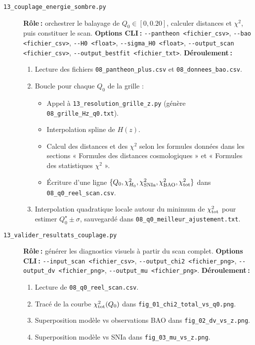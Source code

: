 \begin{description}
  \item[\texttt{13\_couplage\_energie\_sombre.py}]
    \textbf{Rôle :} orchestrer le balayage de \(Q_{0}\in[0,0.20]\), calculer distances et \(\chi^2\), puis constituer le scan.
    \textbf{Options CLI :}
      \verb|--pantheon <fichier_csv>|,
      \verb|--bao <fichier_csv>|,
      \verb|--H0 <float>|,
      \verb|--sigma_H0 <float>|,
      \verb|--output_scan <fichier_csv>|,
      \verb|--output_bestfit <fichier_txt>|.
    \textbf{Déroulement :}
    \begin{enumerate}
      \item Lecture des fichiers \texttt{08\_pantheon\_plus.csv} et \texttt{08\_donnees\_bao.csv}.
      \item Boucle pour chaque \(Q_{0}\) de la grille :
        \begin{itemize}
          \item Appel à \texttt{13\_resolution\_grille\_z.py} (génère \texttt{08\_grille\_Hz\_q0.txt}).
          \item Interpolation spline de \(H(z)\).
           \item Calcul des distances et des \(\chi^2\) selon les formules données dans les sections « Formules des distances cosmologiques » et « Formules des statistiques \(\chi^2\) ».
          \item Écriture d’une ligne \(\{Q_{0},\chi^{2}_{H_{0}},\chi^{2}_{\rm SNIa},\chi^{2}_{\rm BAO},\chi^{2}_{\rm tot}\}\)
                dans \texttt{08\_q0\_reel\_scan.csv}.
        \end{itemize}
      \item Interpolation quadratique locale autour du minimum de \(\chi^{2}_{\rm tot}\)
            pour estimer \(Q_{0}^{\star}\pm\sigma\), sauvegardé dans \texttt{08\_q0\_meilleur\_ajustement.txt}.
    \end{enumerate}

  \item[\texttt{13\_valider\_resultats\_couplage.py}]
    \textbf{Rôle :} générer les diagnostics visuels à partir du scan complet.
    \textbf{Options CLI :}
      \verb|--input_scan <fichier_csv>|,
      \verb|--output_chi2 <fichier_png>|,
      \verb|--output_dv <fichier_png>|,
      \verb|--output_mu <fichier_png>|.
    \textbf{Déroulement :}
    \begin{enumerate}
      \item Lecture de \texttt{08\_q0\_reel\_scan.csv}.
      \item Tracé de la courbe \(\chi^{2}_{\rm tot}(Q_{0})\) dans \texttt{fig\_01\_chi2\_total\_vs\_q0.png}.
      \item Superposition modèle vs observations BAO dans \texttt{fig\_02\_dv\_vs\_z.png}.
      \item Superposition modèle vs SNIa dans \texttt{fig\_03\_mu\_vs\_z.png}.
    \end{enumerate}
\end{description}

